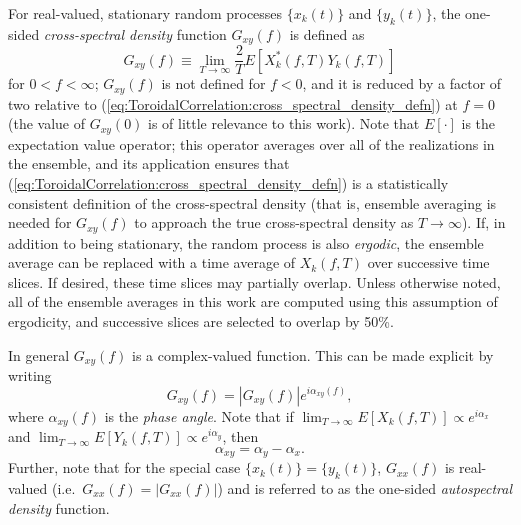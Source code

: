 For real-valued, stationary random processes $\{x_k(t)\}$ and $\{y_k(t)\}$,
the one-sided \emph{cross-spectral density} function $G_{xy}(f)$ is defined as
\begin{equation}
  G_{xy}(f)
  \equiv
  \lim_{T \rightarrow \infty}
  \frac{2}{T} E \left[ X_k^*(f, T) Y_k(f, T) \right]
  \label{eq:ToroidalCorrelation:cross_spectral_density_defn}
\end{equation}
for $0 < f < \infty$;
$G_{xy}(f)$ is not defined for $f < 0$, and
it is reduced by a factor of two relative to
(\ref{eq:ToroidalCorrelation:cross_spectral_density_defn}) at $f = 0$
(the value of $G_{xy}(0)$ is of little relevance to this work).
Note that $E[\cdot]$ is the expectation value operator;
this operator averages over all of the realizations in the ensemble, and
its application ensures that
(\ref{eq:ToroidalCorrelation:cross_spectral_density_defn})
is a statistically consistent definition of the cross-spectral density
(that is, ensemble averaging is needed for $G_{xy}(f)$
to approach the true cross-spectral density
as $T \rightarrow \infty$). %
If, in addition to being stationary,
the random process is also \emph{ergodic},
the ensemble average can be replaced
with a time average of $X_k(f, T)$
over successive time slices.
If desired, these time slices may partially overlap.
Unless otherwise noted,
all of the ensemble averages in this work are computed
using this assumption of ergodicity, and
successive slices are selected to overlap by 50\%.

In general $G_{xy}(f)$ is a complex-valued function.
This can be made explicit by writing
\begin{equation}
  G_{xy}(f) = \left| G_{xy}(f) \right| e^{i \alpha_{xy}(f)},
  \label{eq:ToroidalCorrelation:cross_spectral_density_explicit_complex}
\end{equation}
where $\alpha_{xy}(f)$ is the \emph{phase angle}.
Note that if
$\lim_{T \rightarrow \infty} E[X_k(f, T)] \propto e^{i \alpha_x}$ and
$\lim_{T \rightarrow \infty} E[Y_k(f, T)] \propto e^{i \alpha_y}$, then
\begin{equation}
  \alpha_{xy} = \alpha_y - \alpha_x.
\end{equation}
Further, note that for the special case $\{x_k(t)\} = \{y_k(t)\}$,
$G_{xx}(f)$ is real-valued (i.e.\ $G_{xx}(f) = |G_{xx}(f)|$) and
is referred to as the one-sided \emph{autospectral density} function.

